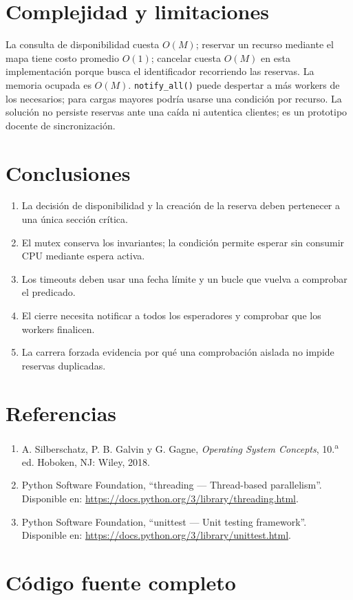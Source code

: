 \documentclass[12pt,a4paper]{article}
\begin{document}
\section{Complejidad y limitaciones}
La consulta de disponibilidad cuesta $O(M)$; reservar un recurso mediante el mapa tiene costo promedio $O(1)$; cancelar cuesta $O(M)$ en esta implementación porque busca el identificador recorriendo las reservas. La memoria ocupada es $O(M)$. \texttt{notify\_all()} puede despertar a más workers de los necesarios; para cargas mayores podría usarse una condición por recurso. La solución no persiste reservas ante una caída ni autentica clientes; es un prototipo docente de sincronización.
\section{Conclusiones}
\begin{enumerate}
\item La decisión de disponibilidad y la creación de la reserva deben pertenecer a una única sección crítica.
\item El mutex conserva los invariantes; la condición permite esperar sin consumir CPU mediante espera activa.
\item Los timeouts deben usar una fecha límite y un bucle que vuelva a comprobar el predicado.
\item El cierre necesita notificar a todos los esperadores y comprobar que los workers finalicen.
\item La carrera forzada evidencia por qué una comprobación aislada no impide reservas duplicadas.
\end{enumerate}
\section{Referencias}
\begin{enumerate}
\item A. Silberschatz, P. B. Galvin y G. Gagne, \emph{Operating System Concepts}, 10.\textsuperscript{a} ed. Hoboken, NJ: Wiley, 2018.
\item Python Software Foundation, ``threading --- Thread-based parallelism''. Disponible en: \url{https://docs.python.org/3/library/threading.html}.
\item Python Software Foundation, ``unittest --- Unit testing framework''. Disponible en: \url{https://docs.python.org/3/library/unittest.html}.
\end{enumerate}
\appendix
\newpage
\section{Código fuente completo}
\end{document}
